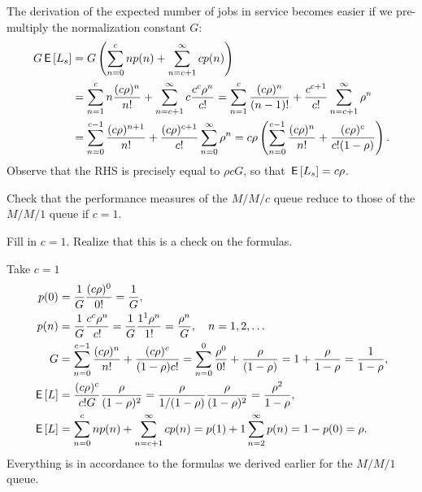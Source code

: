 \begin{exercise}
\begin{solution}
The derivation of the expected number of jobs in service becomes easier if we pre-multiply the normalization constant $G$:
 \begin{align*}
 G \,\mathsf{E}\left[L_s\right]
&= G \left( \sum_{n=0}^{c} n p(n) + \sum_{n=c+1}^{\infty} c p(n) \right) \\
&= \sum_{n=1}^{c} n \frac{(c\rho)^n}{n!} + \sum_{n=c+1}^{\infty} c \frac{c^c\rho^n}{c!}
= \sum_{n=1}^{c} \frac{(c\rho)^n}{(n-1)!} + \frac{c^{c+1}}{c!}\sum_{n=c+1}^{\infty} \rho^n\\
&= \sum_{n=0}^{c-1} \frac{(c\rho)^{n+1}}{n!} + \frac{(c\rho)^{c+1}}{c!}\sum_{n=0}^{\infty} \rho^n
= c\rho \left(\sum_{n=0}^{c-1} \frac{(c\rho)^n}{n!} + \frac{(c\rho)^{c}}{c!(1-\rho)}\right).
 \end{align*}
Observe that the RHS is precisely equal to $\rho c G$, so that $\,\mathsf{E}\left[L_s\right] = c \rho$.
\end{solution}
\end{exercise}


\begin{exercise}
 Check that the performance measures of the $M/M/c$ queue reduce to those of the $M/M/1$ queue if $c=1$.
\begin{hint}
Fill in $c=1$. Realize that this is a check on the formulas.
\end{hint}
\begin{solution}
Take $c=1$
 \begin{align*}
p(0) &= \frac{1}G \frac{(c\rho)^0}{0!}=\frac1 G, \\
p(n) &= \frac{1}G \frac{c^c\rho^n}{c!} = \frac{1}G \frac{1^1\rho^n}{1!} =\frac{\rho^n}G , \quad n=1,2, \ldots \\
G &=\sum_{n=0}^{c-1} \frac{(c\rho)^n}{n!} + \frac{(c\rho)^c}{(1-\rho)c!}
=\sum_{n=0}^{0} \frac{\rho^0}{0!} + \frac{\rho}{(1-\rho)} = 1 + \frac{\rho}{1-\rho} = \frac1{1-\rho},
\\
\,\mathsf{E}\left[L\right] &= \frac{(c\rho)^c}{c! G}\frac{\rho}{(1-\rho)^2} = \frac{\rho}{1/(1-\rho)}\frac{\rho}{(1-\rho)^2} = \frac{\rho^2}{1-\rho}, \\
\,\mathsf{E}\left[L\right] &= \sum_{n=0}^{c}n p(n) + \sum_{n=c+1}^\infty c p(n) = p(1) + 1 \sum_{n=2}^\infty p(n) = 1- p(0) = \rho.
\end{align*}
Everything is in accordance to the formulas we derived earlier for the $M/M/1$ queue.
\end{solution}
\end{exercise}



